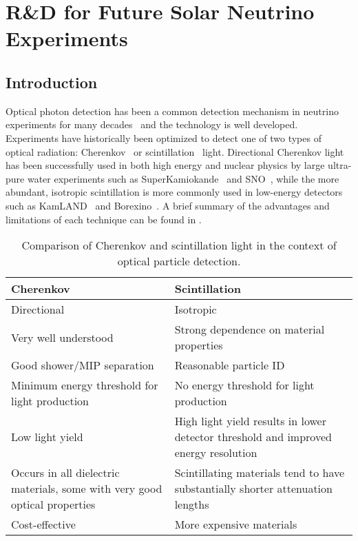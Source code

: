 \chapter{R\&D for Future Solar Neutrino Experiments}
\label{ch:wbls}

\section{Introduction}

Optical photon detection has been a common detection mechanism in neutrino experiments for many decades~\cite{imb,superk,sno,kamland,borexino,lsnd} and the technology is well developed.
Experiments have historically been optimized to detect one of two types of optical radiation: Cherenkov~\cite{cherenkov} or scintillation~\cite{birks} light.  
Directional Cherenkov light has been successfully used in both high energy and nuclear physics by large ultra-pure water experiments such as SuperKamiokande~\cite{superk} and SNO~\cite{sno}, while the more abundant, isotropic scintillation is more commonly used in low-energy detectors such as KamLAND~\cite{kamland} and Borexino~\cite{borexino}.  
A brief summary of the advantages and limitations of each technique can be found in .

\begin{table}[]
\begin{tabularx}{\textwidth}{CC}
Cherenkov & Scintillation \\
\hline
\hline
Directional & Isotropic\\
\hline
Very well understood  & Strong dependence on material properties  \\
\hline
Good shower/MIP separation & Reasonable particle ID  \\
\hline
Minimum energy threshold for light production & No energy threshold for light production  \\
\hline
Low light yield & High light yield results in lower detector threshold and improved energy resolution \\
\hline
Occurs in all dielectric materials, some with very good optical properties & Scintillating materials tend to have substantially shorter attenuation lengths  \\
\hline
Cost-effective & More expensive materials \\
\end{tabularx}
\caption{Comparison of Cherenkov and scintillation light in the context of optical particle detection.}
\label{tab:chervsscint}
\end{table}

